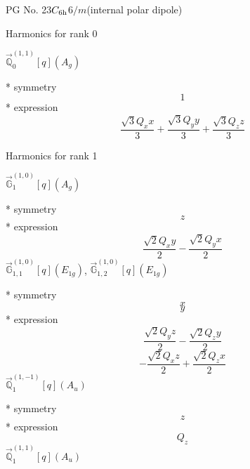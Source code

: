\documentclass[fleqn,8pt]{jsarticle}
\begin{document}
\setcounter{MaxMatrixCols}{32}

\renewcommand{\tablename}{Table~}
\renewcommand{\figurename}{Figure~}
\begin{center}
\LARGE
PG No. 23\quad$C_{\rm 6h}$\quad$6/m$\quad[ hexagonal ] (internal polar dipole)
\end{center}

\noindent * Harmonics for rank 0

\noindent\quad $\vec{\mathbb{Q}}_{0}^{(1,1)}[q](A_{g})$

\noindent\quad ** symmetry
\begin{dmath*}
1
\end{dmath*}
\noindent\quad ** expression
\begin{dmath*}
\frac{\sqrt{3} Q_{x} x}{3} + \frac{\sqrt{3} Q_{y} y}{3} + \frac{\sqrt{3} Q_{z} z}{3}
\end{dmath*}

\noindent * Harmonics for rank 1

\noindent\quad $\vec{\mathbb{G}}_{1}^{(1,0)}[q](A_{g})$

\noindent\quad ** symmetry
\begin{dmath*}
z
\end{dmath*}
\noindent\quad ** expression
\begin{dmath*}
\frac{\sqrt{2} Q_{x} y}{2} - \frac{\sqrt{2} Q_{y} x}{2}
\end{dmath*}
\noindent\quad $\vec{\mathbb{G}}_{1,1}^{(1,0)}[q](E_{1g})$, $\vec{\mathbb{G}}_{1,2}^{(1,0)}[q](E_{1g})$

\noindent\quad ** symmetry
\begin{dmath*}
x
\end{dmath*}
\begin{dmath*}
y
\end{dmath*}
\noindent\quad ** expression
\begin{dmath*}
\frac{\sqrt{2} Q_{y} z}{2} - \frac{\sqrt{2} Q_{z} y}{2}
\end{dmath*}
\begin{dmath*}
- \frac{\sqrt{2} Q_{x} z}{2} + \frac{\sqrt{2} Q_{z} x}{2}
\end{dmath*}
\noindent\quad $\vec{\mathbb{Q}}_{1}^{(1,-1)}[q](A_{u})$

\noindent\quad ** symmetry
\begin{dmath*}
z
\end{dmath*}
\noindent\quad ** expression
\begin{dmath*}
Q_{z}
\end{dmath*}
\noindent\quad $\vec{\mathbb{Q}}_{1}^{(1,1)}[q](A_{u})$
\end{document}
